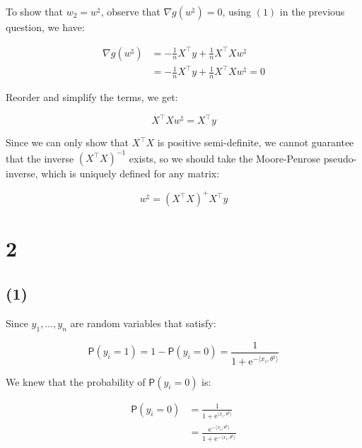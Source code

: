 \documentclass{article}
\begin{document}
To show that $w_2 = w^\natural$, observe that $\nabla g(w^\natural) = 0$, using $(1)$ in the previous question, we have: 

\begin{equation*}
    \begin{split}
        \nabla g(w^\natural) 
            &= - \frac{1}{n} X^\intercal y + \frac{1}{n} X^\intercal Xw^\natural \\
            &= - \frac{1}{n} X^\intercal y + \frac{1}{n} X^\intercal Xw^\natural = 0
    \end{split}
\end{equation*}

Reorder and simplify the terms, we get:

\begin{equation*}
    X^\intercal Xw^\natural = X^\intercal y
\end{equation*}


Since we can only show that $X^\intercal X$ is positive semi-definite, 
we cannot guarantee that the inverse $(X^\intercal X)^{-1}$ exists, 
so we should take the Moore-Penrose pseudo-inverse, 
which is uniquely defined for any matrix:

\begin{equation*}
    w^\natural = (X^\intercal X)^+ X^\intercal y
\end{equation*}

\section*{2}
\subsection*{(1)}

Since $y_1,\dots ,y_n$ are random variables that satisfy:

\begin{equation*}
    \mathsf{P} ( y_i = 1 ) = 1 - \mathsf{P} ( y_i = 0 ) = \frac{1}{1 + \mathrm{e}^{- \langle x_i, \theta^\natural \rangle}} 
\end{equation*}

We knew that the probability of $\mathsf{P} ( y_i = 0 )$ is:

\begin{equation*}
    \begin{split}
        \mathsf{P} ( y_i = 0 ) 
        &= \frac{1}{1 + \mathrm{e}^{\langle x_i, \theta^\natural \rangle}} \\
        &= \frac{\mathrm{e}^{-\langle x_i, \theta^\natural \rangle}}{1 + \mathrm{e}^{-\langle x_i, \theta^\natural \rangle}} 
    \end{split}
\end{equation*}
\end{document}
